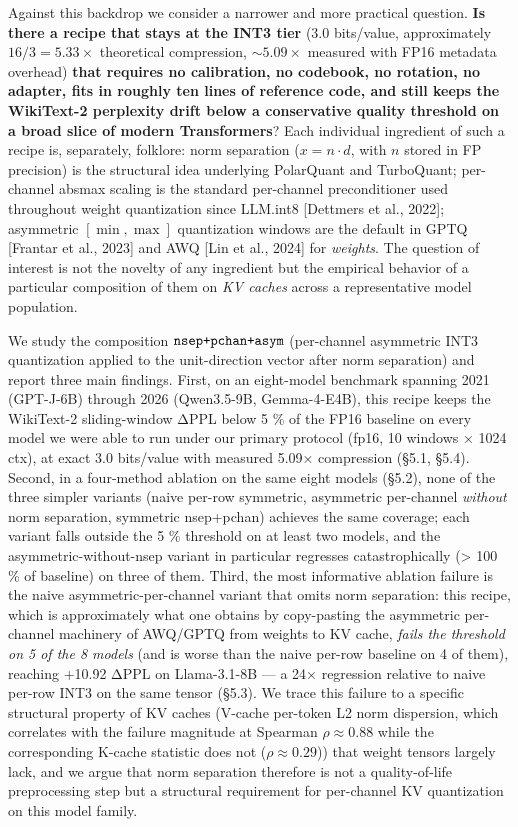 Against this backdrop we consider a narrower and more practical
question. \textbf{Is there a recipe that stays at the INT3 tier} (3.0
bits/value, approximately \(16/3 = 5.33\times\) theoretical compression,
\(\sim\!5.09\times\) measured with FP16 metadata overhead) \textbf{that
requires no calibration, no codebook, no rotation, no adapter, fits in
roughly ten lines of reference code, and still keeps the WikiText-2
perplexity drift below a conservative quality threshold on a broad slice
of modern Transformers}? Each individual ingredient of such a recipe is,
separately, folklore: norm separation (\(x = n \cdot d\), with \(n\)
stored in FP precision) is the structural idea underlying PolarQuant and
TurboQuant; per-channel absmax scaling is the standard per-channel
preconditioner used throughout weight quantization since LLM.int8
{[}Dettmers et al., 2022{]}; asymmetric \([\min, \max]\) quantization
windows are the default in GPTQ {[}Frantar et al., 2023{]} and AWQ
{[}Lin et al., 2024{]} for \emph{weights}. The question of interest is
not the novelty of any ingredient but the empirical behavior of a
particular composition of them on \emph{KV caches} across a
representative model population.

We study the composition \(\text{\tt nsep+pchan+asym}\) (per-channel
asymmetric INT3 quantization applied to the unit-direction vector after
norm separation) and report three main findings. First, on an
eight-model benchmark spanning 2021 (GPT-J-6B) through 2026 (Qwen3.5-9B,
Gemma-4-E4B), this recipe keeps the WikiText-2 sliding-window ΔPPL below
5 \% of the FP16 baseline on every model we were able to run under our
primary protocol (fp16, 10 windows × 1024 ctx), at exact 3.0 bits/value
with measured 5.09× compression (§5.1, §5.4). Second, in a four-method
ablation on the same eight models (§5.2), none of the three simpler
variants (naive per-row symmetric, asymmetric per-channel \emph{without}
norm separation, symmetric nsep+pchan) achieves the same coverage; each
variant falls outside the 5 \% threshold on at least two models, and the
asymmetric-without-nsep variant in particular regresses catastrophically
(\textgreater{} 100 \% of baseline) on three of them. Third, the most
informative ablation failure is the naive asymmetric-per-channel variant
that omits norm separation: this recipe, which is approximately what one
obtains by copy-pasting the asymmetric per-channel machinery of AWQ/GPTQ
from weights to KV cache, \emph{fails the threshold on 5 of the 8
models} (and is worse than the naive per-row baseline on 4 of them),
reaching +10.92 ΔPPL on Llama-3.1-8B --- a 24× regression relative to
naive per-row INT3 on the same tensor (§5.3). We trace this failure to a
specific structural property of KV caches (V-cache per-token L2 norm
dispersion, which correlates with the failure magnitude at Spearman
\(\rho \approx 0.88\) while the corresponding K-cache statistic does not
(\(\rho \approx 0.29\))) that weight tensors largely lack, and we argue
that norm separation therefore is not a quality-of-life preprocessing
step but a structural requirement for per-channel KV quantization on
this model family.

